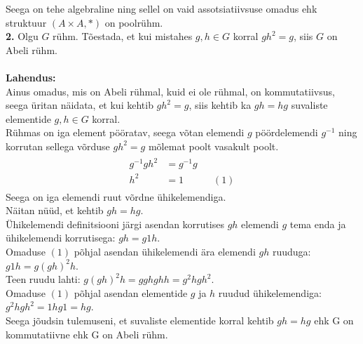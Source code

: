 \documentclass{article}
\begin{document}
Seega on tehe algebraline ning sellel on vaid assotsiatiivsuse omadus ehk struktuur $(A\times A,*)$ on poolrühm.\pagebreak\\
\textbf{2.} Olgu $G$ rühm. Tõestada, et kui mistahes $g,h\in G$ korral $gh^2=g$, siis $G$ on Abeli rühm.\\\\
\textbf{Lahendus:}\\
Ainus omadus, mis on Abeli rühmal, kuid ei ole rühmal, on kommutatiivsus, seega üritan näidata, et kui kehtib $gh^2=g$, siis kehtib ka $gh=hg$ suvaliste elementide $g,h\in G$ korral.\\
Rühmas on iga element pööratav, seega võtan elemendi $g$ pöördelemendi $g^{-1}$ ning korrutan sellega võrduse $gh^2=g$ mõlemat poolt vasakult poolt.
\begin{gather*}
\begin{aligned}
g^{-1}gh^2&=g^{-1}g\\
h^2&=1\qquad\quad(1)
\end{aligned}
\end{gather*}
Seega on iga elemendi ruut võrdne ühikelemendiga.\\
Näitan nüüd, et kehtib $gh=hg$.\\
Ühikelemendi definitsiooni järgi asendan korrutises $gh$ elemendi $g$ tema enda ja ühikelemendi korrutisega: $gh=g1h$.\\
Omaduse $(1)$ põhjal asendan ühikelemendi ära elemendi $gh$ ruuduga: $g1h=g(gh)^2h$.\\
Teen ruudu lahti: $g(gh)^2h=gghghh=g^2hgh^2$.\\
Omaduse $(1)$ põhjal asendan elementide $g$ ja $h$ ruudud ühikelemendiga: $g^2hgh^2=1hg1=hg$.\\
Seega jõudsin tulemuseni, et suvaliste elementide korral kehtib $gh=hg$ ehk G on kommutatiivne ehk G on Abeli rühm.
\end{document}
